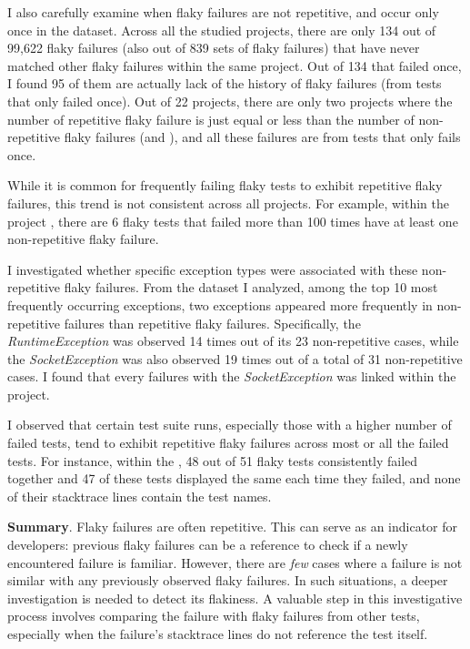 I also carefully examine when flaky failures are not repetitive, and occur only once in the dataset.
Across all the studied projects, there are only 134 out of 99,622 flaky failures (also out of 839 sets of flaky failures) that have never matched other flaky failures within the same project.
Out of 134 that failed once, I found 95 of them are actually lack of the history of flaky failures (from tests that only failed once). Out of 22 projects, there are only two projects where the number of repetitive flaky failure is just equal or less than the number of non-repetitive flaky failures (\elastic and \spring), and all these failures are from tests that only fails once. 





While it is common for frequently failing flaky tests to exhibit repetitive flaky failures, this trend is not consistent across all projects. For example, within the project \hbase, there are 6 flaky tests that failed more than 100 times have at least one non-repetitive flaky failure. 

I investigated whether specific exception types were associated with these non-repetitive flaky failures. From the dataset I analyzed, among the top 10 most frequently occurring exceptions, two exceptions appeared more frequently in non-repetitive failures than repetitive flaky failures. Specifically, the \emph{RuntimeException} was observed 14 times out of its 23 non-repetitive cases, while the \emph{SocketException} was also observed 19 times out of a total of 31 non-repetitive cases. I found that every failures with the \emph{SocketException} was linked within the \okhttp project.


I observed that certain test suite runs, especially those with a higher number of failed tests, tend to exhibit repetitive flaky failures across most or all the failed tests. For instance, within the \ambari, 48 out of 51 flaky tests consistently failed together and 47 of these tests displayed the same \failures each time they failed, and none of their stacktrace lines contain the test names. 



\textbf{Summary}. Flaky failures are often repetitive. This can serve as an indicator for developers: previous flaky failures can be a reference to check if a newly encountered failure is familiar. However, there are \emph{few} cases where a failure is not similar with any previously observed flaky failures. In such situations, a deeper investigation is needed to detect its flakiness. A valuable step in this investigative process involves comparing the failure with flaky failures from other tests, especially when the failure's stacktrace lines do not reference the test itself.



